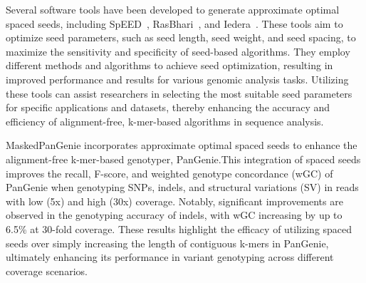 \documentclass{PHlab-thesis}
\begin{document}
Several software tools have been developed to generate approximate optimal spaced seeds, including SpEED~\cite{Lucian2011SpEED}, RasBhari~\cite{Hahn2016Rasbhari}, and Iedera~\cite{Kucherov2006Sensitivity}. These tools aim to optimize seed parameters, such as seed length, seed weight, and seed spacing, to maximize the sensitivity and specificity of seed-based algorithms. They employ different methods and algorithms to achieve seed optimization, resulting in improved performance and results for various genomic analysis tasks. Utilizing these tools can assist researchers in selecting the most suitable seed parameters for specific applications and datasets, thereby enhancing the accuracy and efficiency of alignment-free, k-mer-based algorithms in sequence analysis.

MaskedPanGenie incorporates approximate optimal spaced seeds to enhance the alignment-free k-mer-based genotyper, PanGenie.This integration of spaced seeds improves the recall, F-score, and weighted genotype concordance (wGC) of PanGenie when genotyping SNPs, indels, and structural variations (SV) in reads with low (5x) and high (30x) coverage. Notably, significant improvements are observed in the genotyping accuracy of indels, with wGC increasing by up to 6.5\% at 30-fold coverage. These results highlight the efficacy of utilizing spaced seeds over simply increasing the length of contiguous k-mers in PanGenie, ultimately enhancing its performance in variant genotyping across different coverage scenarios.
\end{document}
